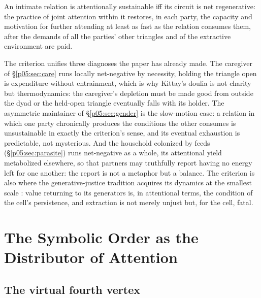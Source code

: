 \begin{crit}\label{p05:crit:sustain}
An intimate relation is attentionally sustainable iff its circuit is net regenerative: the practice of joint attention within it restores, in each party, the capacity and motivation for further attending at least as fast as the relation consumes them, after the demands of all the parties' other triangles and of the extractive environment are paid.
\end{crit}

The criterion unifies three diagnoses the paper has already made. The caregiver of §\ref{p05:sec:care} runs locally net-negative by necessity, holding the triangle open is expenditure without entrainment, which is why Kittay's doulia is not charity but thermodynamics: the caregiver's depletion must be made good from outside the dyad or the held-open triangle eventually falls with its holder. The asymmetric maintainer of §\ref{p05:sec:gender} is the slow-motion case: a relation in which one party chronically produces the conditions the other consumes is unsustainable in exactly the criterion's sense, and its eventual exhaustion is predictable, not mysterious. And the household colonized by feeds (§\ref{p05:sec:parasite}) runs net-negative as a whole, its attentional yield metabolized elsewhere, so that partners may truthfully report having no energy left for one another: the report is not a metaphor but a balance. The criterion is also where the generative-justice tradition acquires its dynamics at the smallest scale \parencite{eglash2016}: value returning to its generators is, in attentional terms, the condition of the cell's persistence, and extraction is not merely unjust but, for the cell, fatal.

\section{The Symbolic Order as the Distributor of Attention}
\label{p05:sec:symbolicdist}

\subsection{The virtual fourth vertex}
\label{p05:sec:fourth}

